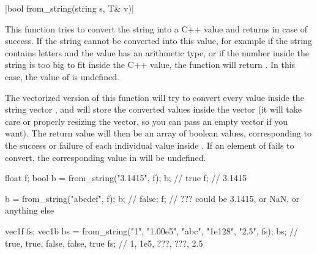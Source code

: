 \item \vectorfunc \cppinline|bool from_string(string s, T& v)| 

This function tries to convert the string  into a C++ value  and returns \cpptrue in case of success. If the string cannot be converted into this value, for example if the string contains letters and the value has an arithmetic type, or if the number inside the string is too big to fit inside the C++ value, the function will return \cppfalse. In this case, the value of  is undefined.

The vectorized version of this function will try to convert every value inside the string vector , and will store the converted values inside the vector  (it will take care or properly resizing the vector, so you can pass an empty vector if you want). The return value will then be an array of boolean values, corresponding to the success or failure of each individual value inside . If an element of  fails to convert, the corresponding value in  will be undefined.

\begin{example}
\begin{cppcode}
float f;
bool b = from_string("3.1415", f);
b; // true
f; // 3.1415

b = from_string("abcdef", f);
b; // false;
f; // ??? could be 3.1415, or NaN, or anything else

vec1f fs;
vec1b bs = from_string({"1", "1.00e5", "abc", "1e128", "2.5"}, fs);
bs; // {true, true, false, false, true}
fs; // {1,    1e5,  ???,   ???,   2.5}
\end{cppcode}
\end{example}
